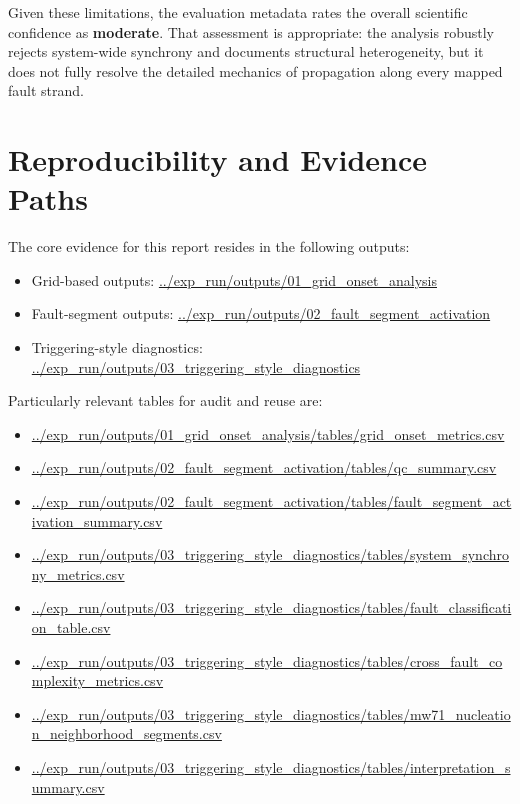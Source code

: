 \documentclass[11pt]{article}
\begin{document}
Given these limitations, the evaluation metadata rates the overall scientific confidence as \textbf{moderate}. That assessment is appropriate: the analysis robustly rejects system-wide synchrony and documents structural heterogeneity, but it does not fully resolve the detailed mechanics of propagation along every mapped fault strand.

\section{Reproducibility and Evidence Paths}
The core evidence for this report resides in the following outputs:
\begin{itemize}
    \item Grid-based outputs: \url{../exp_run/outputs/01_grid_onset_analysis}
    \item Fault-segment outputs: \url{../exp_run/outputs/02_fault_segment_activation}
    \item Triggering-style diagnostics: \url{../exp_run/outputs/03_triggering_style_diagnostics}
\end{itemize}

Particularly relevant tables for audit and reuse are:
\begin{itemize}
    \item \url{../exp_run/outputs/01_grid_onset_analysis/tables/grid_onset_metrics.csv}
    \item \url{../exp_run/outputs/02_fault_segment_activation/tables/qc_summary.csv}
    \item \url{../exp_run/outputs/02_fault_segment_activation/tables/fault_segment_activation_summary.csv}
    \item \url{../exp_run/outputs/03_triggering_style_diagnostics/tables/system_synchrony_metrics.csv}
    \item \url{../exp_run/outputs/03_triggering_style_diagnostics/tables/fault_classification_table.csv}
    \item \url{../exp_run/outputs/03_triggering_style_diagnostics/tables/cross_fault_complexity_metrics.csv}
    \item \url{../exp_run/outputs/03_triggering_style_diagnostics/tables/mw71_nucleation_neighborhood_segments.csv}
    \item \url{../exp_run/outputs/03_triggering_style_diagnostics/tables/interpretation_summary.csv}
\end{itemize}
\end{document}
